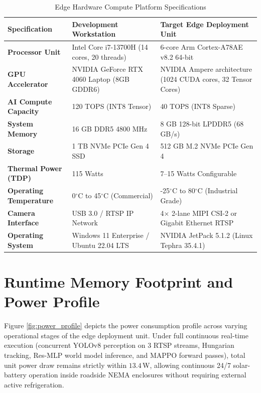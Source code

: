 \documentclass[12pt,a4paper,oneside]{report}
\begin{document}
\begin{table}[htbp]
\centering
\small
\caption{Edge Hardware Compute Platform Specifications}
\label{tab:edge_specs}
\begin{tabularx}{\textwidth}{|p{4.2cm}|p{5.5cm}|X|}
\hline
\textbf{Specification} & \textbf{Development Workstation} & \textbf{Target Edge Deployment Unit} \\ \hline
\textbf{Processor Unit} & Intel Core i7-13700H (14 cores, 20 threads) & 6-core Arm Cortex-A78AE v8.2 64-bit \\ \hline
\textbf{GPU Accelerator} & NVIDIA GeForce RTX 4060 Laptop (8GB GDDR6) & NVIDIA Ampere architecture (1024 CUDA cores, 32 Tensor Cores) \\ \hline
\textbf{AI Compute Capacity} & 120 TOPS (INT8 Tensor) & 40 TOPS (INT8 Sparse) \\ \hline
\textbf{System Memory} & 16 GB DDR5 4800 MHz & 8 GB 128-bit LPDDR5 (68 GB/s) \\ \hline
\textbf{Storage} & 1 TB NVMe PCIe Gen 4 SSD & 512 GB M.2 NVMe PCIe Gen 4 \\ \hline
\textbf{Thermal Power (TDP)} & 115 Watts & 7--15 Watts Configurable \\ \hline
\textbf{Operating Temperature} & 0$^\circ$C to 45$^\circ$C (Commercial) & -25$^\circ$C to 80$^\circ$C (Industrial Grade) \\ \hline
\textbf{Camera Interface} & USB 3.0 / RTSP IP Network & 4$\times$ 2-lane MIPI CSI-2 or Gigabit Ethernet RTSP \\ \hline
\textbf{Operating System} & Windows 11 Enterprise / Ubuntu 22.04 LTS & NVIDIA JetPack 5.1.2 (Linux Tephra 35.4.1) \\ \hline
\end{tabularx}
\end{table}

\section{Runtime Memory Footprint and Power Profile}
Figure \ref{fig:power_profile} depicts the power consumption profile across varying operational stages of the edge deployment unit. Under full continuous real-time execution (concurrent YOLOv8 perception on 3 RTSP streams, Hungarian tracking, Res-MLP world model inference, and MAPPO forward passes), total unit power draw remains strictly within $13.4$\,W, allowing continuous 24/7 solar-battery operation inside roadside NEMA enclosures without requiring external active refrigeration.
\end{document}
